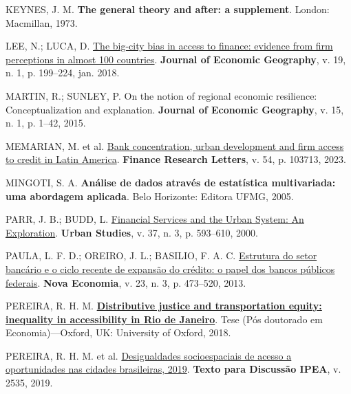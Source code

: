 \documentclass[a4paper,12pt]{article}
\newlength{\cslhangindent}
\newlength{\cslentryspacingunit} %
\newenvironment{CSLReferences}[2] %
 {%
  \setlength{\parindent}{0pt}
  \ifodd #1
  \let\oldpar\par
  \def\par{\hangindent=\cslhangindent\oldpar}
  \fi
  \setlength{\parskip}{#2\cslentryspacingunit}
 }%
 {}
\begin{document}
\begin{CSLReferences}{0}{1}
\leavevmode{}%
KEYNES, J. M. \textbf{The general theory and after: a supplement}.
London: Macmillan, 1973.

\leavevmode{}%
LEE, N.; LUCA, D. \href{https://doi.org/10.1093/jeg/lbx047}{{The
big-city bias in access to finance: evidence from firm perceptions in
almost 100 countries}}. \textbf{Journal of Economic Geography}, v. 19,
n. 1, p. 199--224, jan. 2018.

\leavevmode{}%
MARTIN, R.; SUNLEY, P. On the notion of regional economic resilience:
Conceptualization and explanation. \textbf{Journal of Economic
Geography}, v. 15, n. 1, p. 1--42, 2015.

\leavevmode{}%
MEMARIAN, M. et al.
\href{https://doi.org/10.1016/j.frl.2023.103713}{Bank concentration,
urban development and firm access to credit in Latin America}.
\textbf{Finance Research Letters}, v. 54, p. 103713, 2023.

\leavevmode{}%
MINGOTI, S. A. \textbf{Análise de dados através de estatística
multivariada: uma abordagem aplicada}. Belo Horizonte: Editora UFMG,
2005.

\leavevmode{}%
PARR, J. B.; BUDD, L.
\href{https://doi.org/10.1080/0042098002131}{Financial Services and the
Urban System: An Exploration}. \textbf{Urban Studies}, v. 37, n. 3, p.
593--610, 2000.

\leavevmode{}%
PAULA, L. F. D.; OREIRO, J. L.; BASILIO, F. A. C.
\href{http://www.scielo.br/scielo.php?script=sci_arttext\&pid=S0103-63512013000300001}{Estrutura
do setor bancário e o ciclo recente de expansão do crédito: o papel dos
bancos públicos federais}. \textbf{Nova Economia}, v. 23, n. 3, p.
473--520, 2013.

\leavevmode{}%
PEREIRA, R. H. M.
\textbf{\href{https://ora.ox.ac.uk/objects/uuid:3552ca9f-25c0-4d2f-acdd-0649de911afc}{Distributive
justice and transportation equity: inequality in accessibility in {Rio}
de {Janeiro}}}. Tese (Pós doutorado em Economia)---Oxford, UK:
University of Oxford, 2018.

\leavevmode{}%
PEREIRA, R. H. M. et al.
\href{http://repositorio.ipea.gov.br/handle/11058/9586}{Desigualdades
socioespaciais de acesso a oportunidades nas cidades brasileiras, 2019}.
\textbf{Texto para Discussão IPEA}, v. 2535, 2019.


\end{CSLReferences}
\end{document}
